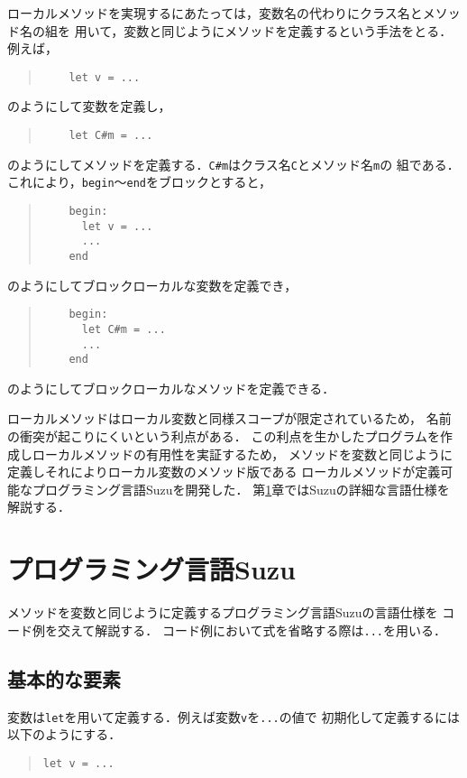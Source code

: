 \documentclass[a4paper,11pt,dvipdfmx]{jreport}
\begin{document}
ローカルメソッドを実現するにあたっては，変数名の代わりにクラス名とメソッド名の組を
用いて，変数と同じようにメソッドを定義するという手法をとる．
例えば，
\begin{quote}
	\begin{verbatim}
	let v = ...
	\end{verbatim}
\end{quote}
のようにして変数を定義し，
\begin{quote}
	\begin{verbatim}
	let C#m = ...
	\end{verbatim}
\end{quote}
のようにしてメソッドを定義する．\verb|C#m|はクラス名\verb|C|とメソッド名\verb|m|の
組である．
これにより，\verb|begin|～\verb|end|をブロックとすると，
\begin{quote}
	\begin{verbatim}
	begin:
	  let v = ...
	  ...
	end
	\end{verbatim}
\end{quote}
のようにしてブロックローカルな変数を定義でき，
\begin{quote}
	\begin{verbatim}
	begin:
	  let C#m = ...
	  ...
	end
	\end{verbatim}
\end{quote}
のようにしてブロックローカルなメソッドを定義できる．

ローカルメソッドはローカル変数と同様スコープが限定されているため，
名前の衝突が起こりにくいという利点がある．
この利点を生かしたプログラムを作成しローカルメソッドの有用性を実証するため，
メソッドを変数と同じように定義しそれによりローカル変数のメソッド版である
ローカルメソッドが定義可能なプログラミング言語Suzuを開発した．
第\ref{chapter:implementation}章ではSuzuの詳細な言語仕様を
解説する．


\chapter{プログラミング言語Suzu}
\label{chapter:implementation}

メソッドを変数と同じように定義するプログラミング言語Suzuの言語仕様を
コード例を交えて解説する．
コード例において式を省略する際は\verb|...|を用いる．

\section{基本的な要素}

変数は\verb|let|を用いて定義する．例えば変数\verb|v|を\verb|...|の値で
初期化して定義するには以下のようにする．
\begin{quote}
\begin{verbatim}
let v = ...
\end{verbatim}
\end{quote}
\end{document}
